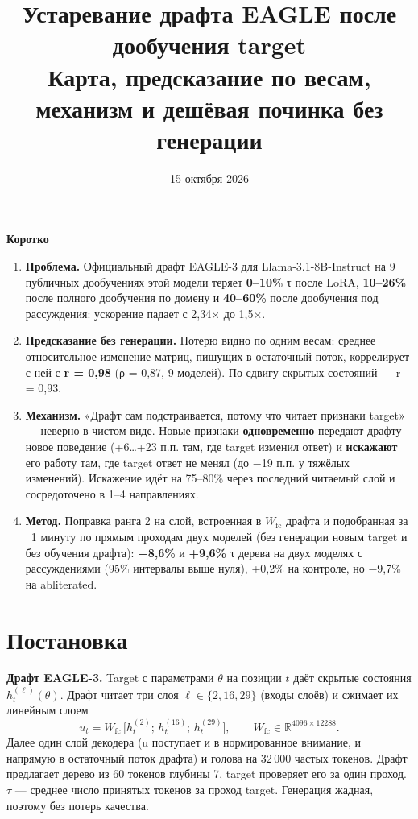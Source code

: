 \documentclass[11pt,a4paper]{article}
\title{\textbf{Устаревание драфта EAGLE после дообучения target}\\[4pt]
\large Карта, предсказание по весам, механизм и дешёвая починка без генерации}
\author{}
\date{15 октября 2026}
\newcommand{\negv}[1]{\textcolor{bad}{#1}}
\newcommand{\fc}{\mathrm{fc}}
\begin{document}
\maketitle
\vspace{-1.0cm}

\begin{keybox}
\textbf{Коротко}
\begin{enumerate}[leftmargin=*]
\item \textbf{Проблема.} Официальный драфт EAGLE-3 для Llama-3.1-8B-Instruct на 9 публичных дообучениях этой модели
теряет \textbf{0--10\%} τ после LoRA, \textbf{10--26\%} после полного дообучения по домену и \textbf{40--60\%} после
дообучения под рассуждения: ускорение падает с 2,34× до 1,5×.
\item \textbf{Предсказание без генерации.} Потерю видно по одним весам: среднее относительное изменение матриц,
пишущих в остаточный поток, коррелирует с ней с \textbf{r = 0,98} (ρ = 0,87, 9 моделей). По сдвигу скрытых состояний
--- r = 0,93.
\item \textbf{Механизм.} «Драфт сам подстраивается, потому что читает признаки target» --- неверно в чистом виде.
Новые признаки \textbf{одновременно} передают драфту новое поведение (+6…+23 п.п. там, где target изменил ответ)
и \textbf{искажают} его работу там, где target ответ не менял (до −19 п.п. у тяжёлых изменений). Искажение идёт на
75--80\% через последний читаемый слой и сосредоточено в 1--4 направлениях.
\item \textbf{Метод.} Поправка ранга 2 на слой, встроенная в $W_{\fc}$ драфта и подобранная за ~1 минуту по прямым
проходам двух моделей (без генерации новым target и без обучения драфта): \textbf{+8,6\%} и \textbf{+9,6\%} τ дерева
на двух моделях с рассуждениями (95\% интервалы выше нуля), +0,2\% на контроле, но \negv{−9,7\%} на abliterated.
\end{enumerate}
\end{keybox}

\section{Постановка}

\textbf{Драфт EAGLE-3.} Target с параметрами $\theta$ на позиции $t$ даёт скрытые состояния $h^{(\ell)}_t(\theta)$.
Драфт читает три слоя $\ell\in\{2,16,29\}$ (входы слоёв) и сжимает их линейным слоем
\[
u_t = W_{\fc}\,\big[h^{(2)}_t;\,h^{(16)}_t;\,h^{(29)}_t\big],\qquad W_{\fc}\in\mathbb R^{4096\times 12288}.
\]
Далее один слой декодера (u поступает и в нормированное внимание, и напрямую в остаточный поток драфта) и голова на
32\,000 частых токенов. Драфт предлагает дерево из 60 токенов глубины 7, target проверяет его за один проход.
$\tau$ --- среднее число принятых токенов за проход target. Генерация жадная, поэтому без потерь качества.
\end{document}
